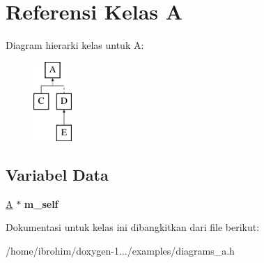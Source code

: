 \hypertarget{classA}{}\section{Referensi Kelas A}
\label{classA}
Diagram hierarki kelas untuk A\+:\begin{figure}[H]
\begin{center}
\leavevmode
\includegraphics[height=3.000000cm]{d2/d88/classA}
\end{center}
\end{figure}
\subsection*{Variabel Data}
\begin{DoxyCompactItemize}
\item 
\hypertarget{classA_a086d3a4efc697dba0601b9fef3d082ad}{}\hyperlink{classA}{A} $\ast$ {\bfseries m\+\_\+self}\label{classA_a086d3a4efc697dba0601b9fef3d082ad}

\end{DoxyCompactItemize}


Dokumentasi untuk kelas ini dibangkitkan dari file berikut\+:\begin{DoxyCompactItemize}
\item 
/home/ibrohim/doxygen-\/1.../examples/diagrams\+\_\+a.\+h\end{DoxyCompactItemize}
